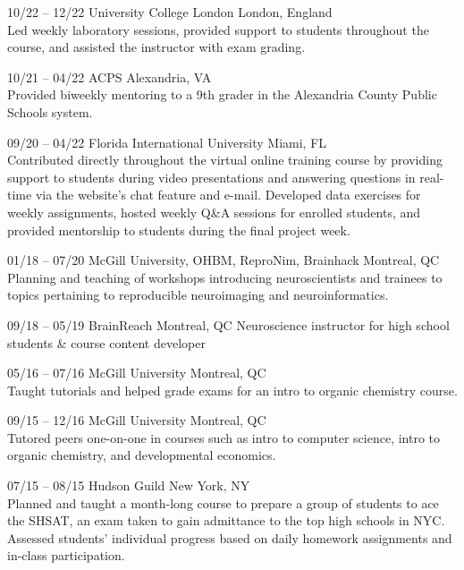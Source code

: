 \documentclass[]{friggeri-cv} %
\begin{document}
\begin{entrylist}

\entry
{10/22 -- 12/22}
{University College London}
{London, England}
{ \\
Led weekly laboratory sessions, provided support to students throughout the course, and assisted the instructor with exam grading.}

\entry
{10/21 -- 04/22}
{ACPS}
{Alexandria, VA}
{} \\
Provided biweekly mentoring to a 9th grader in the Alexandria County Public Schools system. 

\entry
{09/20 -- 04/22}
{Florida International University}
{Miami, FL}
{ \\
Contributed directly throughout the virtual online training course by providing support to students
during video presentations and answering questions in real-time via the website’s chat
feature and e-mail. Developed data exercises for weekly assignments, hosted weekly Q\&A sessions for enrolled students, 
and provided mentorship to students during the final project week.}

\entry
{01/18 -- 07/20}
{McGill University, OHBM, ReproNim, Brainhack}
{Montreal, QC}
{ \\
Planning and teaching of workshops introducing neuroscientists and trainees to
topics pertaining to reproducible neuroimaging and neuroinformatics.}

\entry
{09/18 -- 05/19}
{BrainReach}
{Montreal, QC}
{Neuroscience instructor for high school students \& course content developer}

\entry
{05/16 -- 07/16}
{McGill University}
{Montreal, QC}
{ \\
Taught tutorials and helped grade exams for an intro to organic chemistry course.
}

\entry
{09/15 -- 12/16}
{McGill University}
{Montreal, QC}
{ \\
Tutored peers one-on-one in courses such as intro to computer science, intro to organic chemistry,
and developmental economics.
}

\entry
{07/15 -- 08/15}
{Hudson Guild}
{New York, NY}
{ \\
Planned and taught a month-long course to prepare a group of students to ace the SHSAT, 
an exam taken to gain admittance to the top high schools in NYC. Assessed students'
individual progress based on daily homework assignments and in-class participation.}

\end{entrylist}
\end{document}
